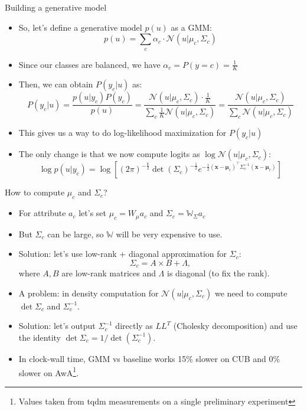 \documentclass[10pt]{beamer}
\begin{document}
\begin{frame}{Building a generative model}
\begin{itemize}
    \item\pause So, let's define a generative model $p(u)$ as a GMM:
    \[
    p(u) = \sum_c \alpha_c \cdot \mathcal{N}(u | \mu_c, \Sigma_c)
    \]
    \item\pause Since our classes are balanced, we have $\alpha_c = P(y=c) = \frac{1}{K}$
    \item\pause Then, we can obtain $P(y_c | u)$ as:
    \[
    P(y_c | u) = \frac{p(u | y_c) P(y_c)}{p(u)} = \frac{\mathcal{N}(u | \mu_c, \Sigma_c) \cdot \frac{1}{K}}{\sum_c \frac{1}{K} \mathcal{N}(u | \mu_c, \Sigma_c)} = \frac{\mathcal{N}(u | \mu_c, \Sigma_c)}{\sum_c \mathcal{N}(u | \mu_c, \Sigma_c)}
    \]
    \item\pause This gives us a way to do log-likelihood maximization for $P(y_c|u)$
    \item\pause The only change is that we now compute logits as $\log \mathcal{N}(u | \mu_c, \Sigma_c)$:
    \[
    \log p(u|y_c) = \log \left[(2 \pi)^{-\frac{k}{2}} \operatorname{det}(\Sigma_c)^{-\frac{1}{2}} e^{-\frac{1}{2}(\mathbf{x}-\boldsymbol{\mu}_c)^{\top} \Sigma_c^{-1}(\mathbf{x}-\boldsymbol{\mu}_c)}\right]
    \]
\end{itemize}
\end{frame}


\begin{frame}{How to compute $\mu_c$ and $\Sigma_c$?}
\begin{itemize}
    \item\pause For attribute $a_c$ let's set $\mu_c = W_{\mu} a_c$ and $\Sigma_c = \mathbb{W}_{\Sigma} a_c$
    \item\pause But $\Sigma_c$ can be large, so $\mathbb{W}$ will be very expensive to use.
    \item\pause Solution: let's use low-rank + diagonal approximation for $\Sigma_c$:
    \[
    \Sigma_c = A\times B + \Lambda,
    \]
    where $A,B$ are low-rank matrices and $\Lambda$ is diagonal (to fix the rank).
    \item\pause A problem: in density computation for $\mathcal{N}(u | \mu_c, \Sigma_c)$ we need to compute $\det \Sigma_c$ and $\Sigma^{-1}_c$.
    \item\pause Solution: let's output $\Sigma^{-1}_c$ directly as $LL^{T}$ (Cholesky decomposition) and use the identity $\det \Sigma_c = 1/\det (\Sigma_c^{-1})$.
    \item\pause In clock-wall time, GMM vs baseline works 15\% slower on CUB and 0\% slower on AwA\footnote{Values taken from tqdm measurements on a single preliminary experiment}.
\end{itemize}
\end{frame}
\end{document}
